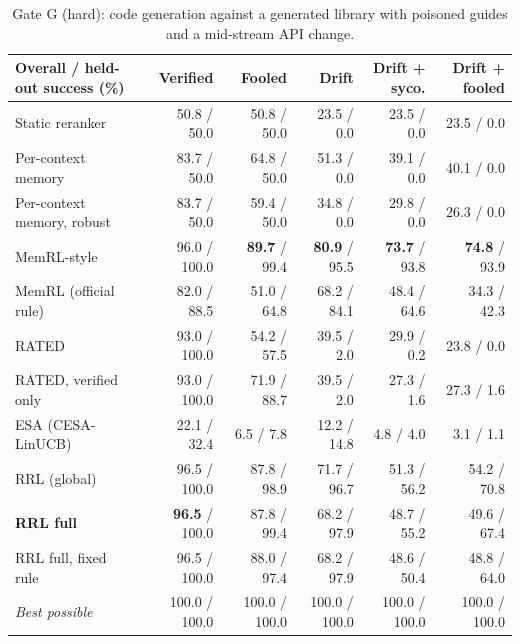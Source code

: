 \begin{table}[t]
\centering
\small
\setlength{\tabcolsep}{3.5pt}
\begin{tabular}{lrrrrr}
\toprule
Overall / held-out success (\%) & Verified & Fooled & Drift & Drift + syco. & Drift + fooled \\
\midrule
Static reranker & 50.8 / 50.0 & 50.8 / 50.0 & 23.5 / 0.0 & 23.5 / 0.0 & 23.5 / 0.0 \\
Per-context memory & 83.7 / 50.0 & 64.8 / 50.0 & 51.3 / 0.0 & 39.1 / 0.0 & 40.1 / 0.0 \\
Per-context memory, robust & 83.7 / 50.0 & 59.4 / 50.0 & 34.8 / 0.0 & 29.8 / 0.0 & 26.3 / 0.0 \\
MemRL-style & 96.0 / 100.0 & \textbf{89.7} / 99.4 & \textbf{80.9} / 95.5 & \textbf{73.7} / 93.8 & \textbf{74.8} / 93.9 \\
MemRL (official rule) & 82.0 / 88.5 & 51.0 / 64.8 & 68.2 / 84.1 & 48.4 / 64.6 & 34.3 / 42.3 \\
RATED & 93.0 / 100.0 & 54.2 / 57.5 & 39.5 / 2.0 & 29.9 / 0.2 & 23.8 / 0.0 \\
RATED, verified only & 93.0 / 100.0 & 71.9 / 88.7 & 39.5 / 2.0 & 27.3 / 1.6 & 27.3 / 1.6 \\
ESA (CESA-LinUCB) & 22.1 / 32.4 & 6.5 / 7.8 & 12.2 / 14.8 & 4.8 / 4.0 & 3.1 / 1.1 \\
\midrule
RRL (global) & 96.5 / 100.0 & 87.8 / 98.9 & 71.7 / 96.7 & 51.3 / 56.2 & 54.2 / 70.8 \\
\textbf{RRL full} & \textbf{96.5} / 100.0 & 87.8 / 99.4 & 68.2 / 97.9 & 48.7 / 55.2 & 49.6 / 67.4 \\
RRL full, fixed rule & 96.5 / 100.0 & 88.0 / 97.4 & 68.2 / 97.9 & 48.6 / 50.4 & 48.8 / 64.0 \\
\textit{Best possible} & 100.0 / 100.0 & 100.0 / 100.0 & 100.0 / 100.0 & 100.0 / 100.0 & 100.0 / 100.0 \\
\bottomrule
\end{tabular}
\caption{Gate G (hard): code generation against a generated library with poisoned guides and a mid-stream API change.}
\label{tab:gateg}
\end{table}
